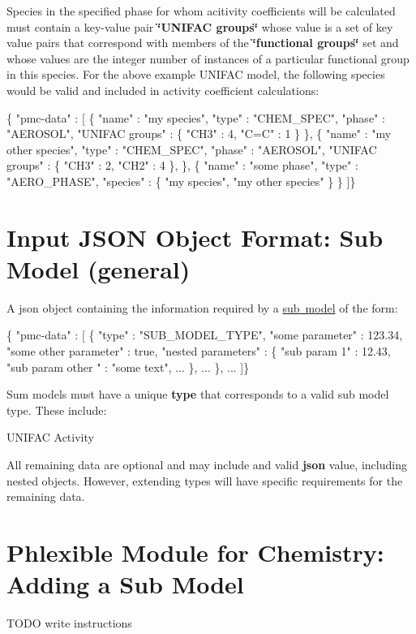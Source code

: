 Species in the specified phase for whom acitivity coefficients will be calculated must contain a key-\/value pair {\bfseries \char`\"{}\+U\+N\+I\+F\+A\+C groups\char`\"{}} whose value is a set of key value pairs that correspond with members of the {\bfseries \char`\"{}functional groups\char`\"{}} set and whose values are the integer number of instances of a particular functional group in this species. For the above example U\+N\+I\+F\+AC model, the following species would be valid and included in activity coefficient calculations\+: 
\begin{DoxyCode}
\{ "pmc-data" : [
  \{
    "name" : "my species",
    "type" : "CHEM\_SPEC",
    "phase" : "AEROSOL",
    "UNIFAC groups" : \{
      "CH3" : 4,
      "C=C" : 1
    \}
  \},
  \{
    "name" : "my other species",
    "type" : "CHEM\_SPEC",
    "phase" : "AEROSOL",
    "UNIFAC groups" : \{
      "CH3" : 2,
      "CH2" : 4
    \},
  \},
  \{
    "name" : "some phase",
    "type" : "AERO\_PHASE",
    "species" : \{ "my species", "my other species" \}
  \}
]\}
\end{DoxyCode}
 \hypertarget{input_format_sub_model}{}\section{Input J\+S\+ON Object Format\+: Sub Model (general)}\label{input_format_sub_model}
A {\ttfamily json} object containing the information required by a \mbox{\hyperlink{phlex_sub_model}{sub model}} of the form\+:


\begin{DoxyCode}
\{ "pmc-data" : [
  \{
    "type" : "SUB\_MODEL\_TYPE",
    "some parameter" : 123.34,
    "some other parameter" : true,
    "nested parameters" : \{
      "sub param 1" : 12.43,
      "sub param other " : "some text",
      ...
    \},
    ...
  \},
  ...
]\}
\end{DoxyCode}
 Sum models must have a unique {\bfseries type} that corresponds to a valid sub model type. These include\+:


\begin{DoxyItemize}
\item U\+N\+I\+F\+AC Activity
\end{DoxyItemize}

All remaining data are optional and may include and valid {\bfseries json} value, including nested objects. However, extending types will have specific requirements for the remaining data. \hypertarget{phlex_sub_model_add}{}\section{Phlexible Module for Chemistry\+: Adding a Sub Model}\label{phlex_sub_model_add}
T\+O\+DO write instructions 